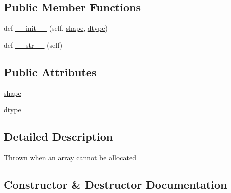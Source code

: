 \subsection*{Public Member Functions}
\begin{DoxyCompactItemize}
\item 
def \hyperlink{classnumpy_1_1core_1_1__exceptions_1_1__ArrayMemoryError_abbfc06e3ce8e87e5bcc4bdabeccb03d6}{\+\_\+\+\_\+init\+\_\+\+\_\+} (self, \hyperlink{classnumpy_1_1core_1_1__exceptions_1_1__ArrayMemoryError_a56d704713efe186d8ee89cc0b8b46a5c}{shape}, \hyperlink{classnumpy_1_1core_1_1__exceptions_1_1__ArrayMemoryError_aea72055f3f3402273d3397514e90785c}{dtype})
\item 
def \hyperlink{classnumpy_1_1core_1_1__exceptions_1_1__ArrayMemoryError_a5d7f2943d019aa80ef5103bd2fc68a56}{\+\_\+\+\_\+str\+\_\+\+\_\+} (self)
\end{DoxyCompactItemize}
\subsection*{Public Attributes}
\begin{DoxyCompactItemize}
\item 
\hyperlink{classnumpy_1_1core_1_1__exceptions_1_1__ArrayMemoryError_a56d704713efe186d8ee89cc0b8b46a5c}{shape}
\item 
\hyperlink{classnumpy_1_1core_1_1__exceptions_1_1__ArrayMemoryError_aea72055f3f3402273d3397514e90785c}{dtype}
\end{DoxyCompactItemize}


\subsection{Detailed Description}
\begin{DoxyVerb}Thrown when an array cannot be allocated\end{DoxyVerb}
 

\subsection{Constructor \& Destructor Documentation}
\mbox{\label{classnumpy_1_1core_1_1__exceptions_1_1__ArrayMemoryError_abbfc06e3ce8e87e5bcc4bdabeccb03d6}} 
